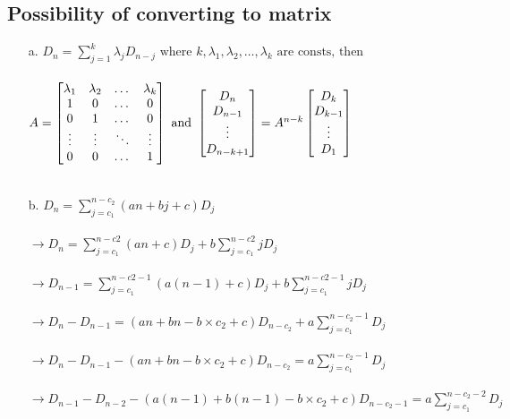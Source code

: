 \subsection{Possibility of converting to matrix}
\begin{enumerate}
    \item[a.]$D_n = \sum_{j=1}^k \lambda_j D_{n-j}\text{ where }k,\lambda_1, \lambda_2, \dots, \lambda_k \text{ are consts, then}$ \\
    \\
    $A=\begin{bmatrix}
    \lambda_1 & \lambda_2 & \dots & \lambda_k\\
    1 & 0 & \dots & 0\\
    0 & 1 & \dots & 0\\
    \vdots & \vdots & \ddots  & \vdots \\
    0 & 0 & \dots & 1 
    \end{bmatrix}
    \text{ and }
    \begin{bmatrix}
    D_n \\
    D_{n-1}\\
    \vdots \\
    D_{n-k+1}
    \end{bmatrix}
    =
    A^{n-k}
    \begin{bmatrix}
    D_{k} \\
    D_{k-1}\\
    \vdots \\
    D_{1}
    \end{bmatrix}\\
$
    \\\
    \item[b.] $D_n = \sum_{j=c_1}^{n-c_2} (an+bj+c) D_j$ \\
    \\
    $\rightarrow D_n = \sum_{j=c_1}^{n-c2}(an+c)D_j + b\sum_{j=c_1}^{n-c2}jD_j$\\
    \\
    $\rightarrow D_{n-1} = \sum_{j=c_1}^{n-c2-1}(a(n-1)+c)D_j + b\sum_{j=c_1}^{n-c2-1}jD_j$\\
    \\
    $\rightarrow D_n - D_{n-1} = (an+bn-b\times c_2+c)D_{n-c_2} + a\sum_{j=c_1}^{n-c_2-1}D_j$ \\
    \\
    $\rightarrow D_n - D_{n-1} - (an+bn-b\times c_2+c)D_{n-c_2} = a\sum_{j=c_1}^{n-c_2-1}D_j$\\
    \\
    $\rightarrow D_{n-1} - D_{n-2} - (a(n-1)+b(n-1)-b\times c_2+c)D_{n-c_2-1} = a\sum_{j=c_1}^{n-c_2-2}D_j$\\

\end{enumerate}
